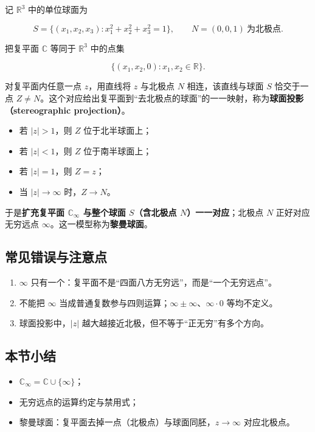 记 \(\mathbb{R}^3\) 中的单位球面为

\[
S = \{(x_1,x_2,x_3): x_1^2+x_2^2+x_3^2=1\},
\qquad N=(0,0,1)\ \text{为北极点}.
\]

把复平面 \(\mathbb{C}\) 等同于 \(\mathbb{R}^3\) 中的点集

\[
\{(x_1,x_2,0): x_1,x_2\in\mathbb{R}\}.
\]

对复平面内任意一点 \(z\)，用直线将 \(z\) 与北极点 \(N\)
相连，该直线与球面 \(S\) 恰交于一点
\(Z\neq N\)。这个对应给出复平面到``去北极点的球面''的一一映射，称为\textbf{球面投影（stereographic
projection）}。

\begin{itemize}
\tightlist
\item
  若 \(|z|>1\)，则 \(Z\) 位于北半球面上；
\item
  若 \(|z|<1\)，则 \(Z\) 位于南半球面上；
\item
  若 \(|z|=1\)，则 \(Z=z\)；
\item
  当 \(|z|\to\infty\) 时，\(Z\to N\)。
\end{itemize}

于是\textbf{扩充复平面 \(\mathbb{C}_\infty\) 与整个球面 \(S\)（含北极点
\(N\)）一一对应}；北极点 \(N\) 正好对应无穷远点
\(\infty\)。这一模型称为\textbf{黎曼球面}。

\subsection{常见错误与注意点}\label{ux5e38ux89c1ux9519ux8befux4e0eux6ce8ux610fux70b9-2}

\begin{enumerate}
\def\labelenumi{\arabic{enumi}.}
\tightlist
\item
  \(\infty\)
  只有一个：复平面不是``四面八方无穷远''，而是``一个无穷远点''。
\item
  不能把 \(\infty\)
  当成普通复数参与四则运算；\(\infty\pm\infty\)、\(\infty\cdot 0\)
  等均不定义。
\item
  球面投影中，\(|z|\) 越大越接近北极，但不等于``正无穷''有多个方向。
\end{enumerate}

\subsection{本节小结}\label{ux672cux8282ux5c0fux7ed3-2}

\begin{itemize}
\tightlist
\item
  \(\mathbb{C}_\infty=\mathbb{C}\cup\{\infty\}\)；
\item
  无穷远点的运算约定与禁用式；
\item
  黎曼球面：复平面去掉一点（北极点）与球面同胚，\(z\to\infty\)
  对应北极点。
\end{itemize}

